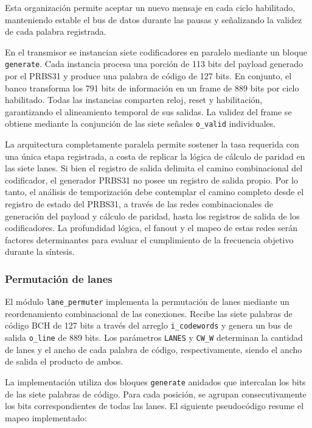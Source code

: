 \documentclass[10pt,a4paper]{article}
\begin{document}
Esta organización permite aceptar un nuevo mensaje en cada
ciclo habilitado, manteniendo estable el bus de datos durante
las pausas y señalizando la validez de cada palabra registrada.

En el transmisor se instancian siete codificadores en paralelo
mediante un bloque \texttt{generate}. Cada instancia procesa
una porción de 113 bits del payload generado por el PRBS31
y produce una palabra de código de 127 bits. En conjunto,
el banco transforma los 791 bits de información en un frame
de 889 bits por ciclo habilitado. Todas las instancias
comparten reloj, reset y habilitación, garantizando el
alineamiento temporal de sus salidas. La validez del frame
se obtiene mediante la conjunción de las siete señales
\texttt{o\_valid} individuales.

La arquitectura completamente paralela permite sostener
la tasa requerida con una única etapa registrada, a costa
de replicar la lógica de cálculo de paridad en las siete
lanes. Si bien el registro de salida delimita el camino
combinacional del codificador, el generador PRBS31 no posee
un registro de salida propio. Por lo tanto, el análisis
de temporización debe contemplar el camino completo desde
el registro de estado del PRBS31, a través de las redes
combinacionales de generación del payload y cálculo de
paridad, hasta los registros de salida de los codificadores.
La profundidad lógica, el fanout y el mapeo de estas redes
serán factores determinantes para evaluar el cumplimiento
de la frecuencia objetivo durante la síntesis.

\subsubsection{Permutación de lanes}

El módulo \texttt{lane\_permuter} implementa la permutación de lanes
mediante un reordenamiento combinacional de las conexiones. Recibe
las siete palabras de código BCH de 127 bits a través del arreglo
\texttt{i\_codewords} y genera un bus de salida \texttt{o\_line}
de 889 bits. Los parámetros \texttt{LANES} y \texttt{CW\_W}
determinan la cantidad de lanes y el ancho de cada palabra de
código, respectivamente, siendo el ancho de salida el producto
de ambos.

La implementación utiliza dos bloques \texttt{generate} anidados
que intercalan los bits de las siete palabras de código. Para
cada posición, se agrupan consecutivamente los bits correspondientes
de todas las lanes. El siguiente pseudocódigo resume el mapeo
implementado:
\end{document}
